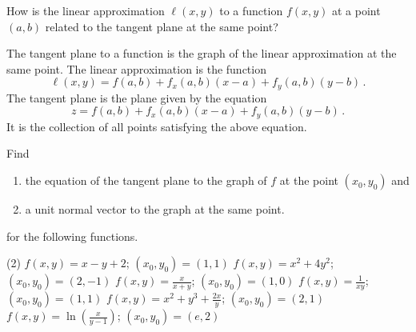 \begin{question}
How is the linear approximation $\ell(x,y)$ to a function $f(x,y)$ at a point $(a,b)$ related to the tangent plane at the same point?
\end{question}

\begin{solution}
The tangent plane to a function is the graph of the linear approximation at the same point. The linear approximation is the function
\[
\ell(x,y) = f(a,b) + f_x(a,b)(x-a) + f_y(a,b)(y-b)\,.
\]
The tangent plane is the plane given by the equation
\[
z = f(a,b) + f_x(a,b)(x-a) + f_y(a,b)(y-b)\,.
\]
It is the collection of all points satisfying the above equation.
\end{solution}

\begin{question}
Find
\begin{enumerate}[label=(\roman*)]
\item
the equation of the tangent plane to the graph of $f$ at the point $(x_0, y_0)$ and
\item
a unit normal vector to the graph at the same point.
\end{enumerate}
for the following functions.
\begin{tasks}(2)
\task
$f(x,y) = x-y+2$; $(x_0,y_0) = (1,1)$
\task
$f(x,y) = x^2 + 4y^2$; $(x_0,y_0) = (2,-1)$
\task
$\displaystyle
f(x,y) = \frac{x}{x+y}$; $(x_0,y_0) = (1,0)$
\task
$f(x,y) = \frac 1{xy}$; $(x_0,y_0) = (1,1)$
\task
$f(x,y) = x^2 + y^3 + \frac{2x}{y}$; $(x_0, y_0) = (2,1)$
\task
$f(x,y) = \ln \left(\frac x{y-1}\right)$; $(x_0, y_0) = (e, 2)$
\end{tasks}
\end{question}

